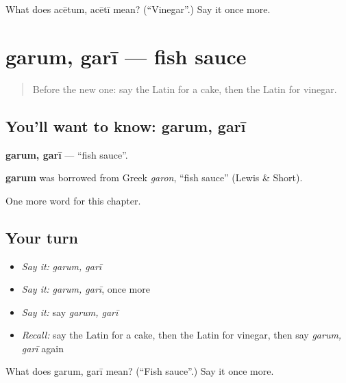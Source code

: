 \begin{tcolorbox}[breakable,colback=teal!4,colframe=teal!35!black,title={Before you move on}]
What does acētum, acētī mean? (\textquotedblleft{}Vinegar\textquotedblright{}.) Say it once more.
\end{tcolorbox}
\section[garum, garī]{garum, garī — fish sauce}

\label{lesson:LA-C195-garum}



\begin{quote}
Before the new one: say the Latin for a cake, then the Latin for vinegar.
\end{quote}

\subsection*{You'll want to know: garum, garī}
\textbf{garum, garī} — \textquotedblleft{}fish sauce\textquotedblright{}.

\begin{cousinweb}
\textbf{garum} was borrowed from Greek \emph{garon}, \textquotedblleft{}fish sauce\textquotedblright{} (Lewis \& Short).
\end{cousinweb}

\begin{grammarlens}[title={What you've built}]
One more word for this chapter.
\end{grammarlens}

\subsection*{Your turn}
\begin{itemize}
\raggedright
  \item \emph{Say it:} \emph{garum, garī}
  \item \emph{Say it:} \emph{garum, garī}, once more
  \item \emph{Say it:} say \emph{garum, garī}
  \item \emph{Recall:} say the Latin for a cake, then the Latin for vinegar, then say \emph{garum, garī} again
\end{itemize}

\begin{tcolorbox}[breakable,colback=teal!4,colframe=teal!35!black,title={Before you move on}]
What does garum, garī mean? (\textquotedblleft{}Fish sauce\textquotedblright{}.) Say it once more.
\end{tcolorbox}
